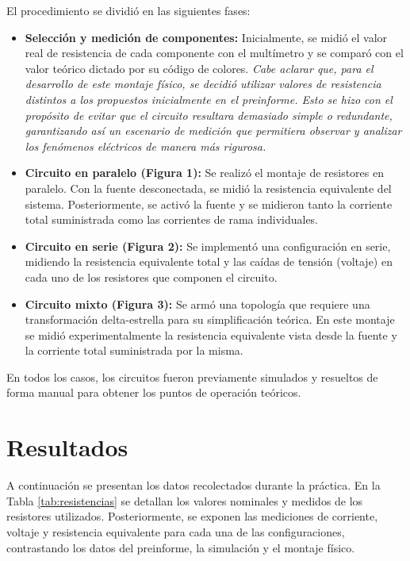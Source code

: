 \documentclass[journal]{IEEEtran}
\begin{document}
El procedimiento se dividió en las siguientes fases:
\begin{itemize}
    
    \item \textbf{Selección y medición de componentes:} Inicialmente, se midió el valor real de resistencia de cada componente con el multímetro y se comparó 
    con el valor teórico dictado por su código de colores. \textit{Cabe aclarar que, para el desarrollo de este montaje físico, se decidió utilizar valores de 
    resistencia distintos a los propuestos inicialmente en el preinforme. Esto se hizo con el propósito de evitar que el circuito resultara demasiado simple o 
    redundante, garantizando así un escenario de medición que permitiera observar y analizar los fenómenos eléctricos de manera más rigurosa.}
    
    \item \textbf{Circuito en paralelo (Figura 1):} Se realizó el montaje de resistores en paralelo. Con la fuente desconectada, se midió la resistencia 
    equivalente del sistema. Posteriormente, se activó la fuente y se midieron tanto la corriente total suministrada como las corrientes de rama individuales.
    
    \item \textbf{Circuito en serie (Figura 2):} Se implementó una configuración en serie, midiendo la resistencia equivalente total y las caídas de tensión (voltaje) en 
    cada uno de los resistores que componen el circuito.
    
    \item \textbf{Circuito mixto (Figura 3):} Se armó una topología que requiere una transformación delta-estrella para su simplificación teórica. 
    En este montaje se midió experimentalmente la resistencia equivalente vista desde la fuente y la corriente total suministrada por la misma.

\end{itemize}
En todos los casos, los circuitos fueron previamente simulados y resueltos de forma manual para obtener los puntos de operación teóricos.

\section{Resultados}
A continuación se presentan los datos recolectados durante la práctica. En la Tabla \ref{tab:resistencias} se detallan los valores nominales y medidos de los 
resistores utilizados. Posteriormente, se exponen las mediciones de corriente, voltaje y resistencia equivalente para cada una de las configuraciones, contrastando los 
datos del preinforme, la simulación y el montaje físico.
\end{document}
